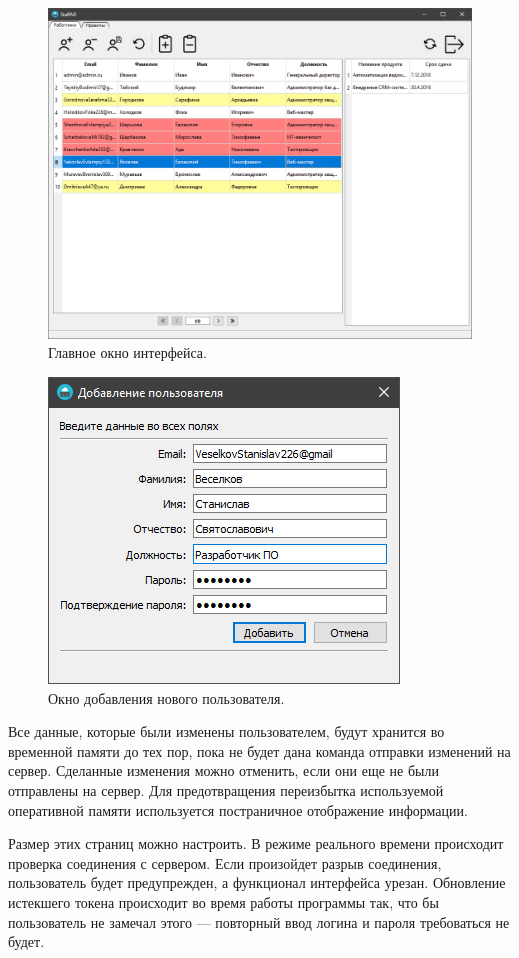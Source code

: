 \begin{figure}[h]
    \centering
    \includegraphics[width=1\linewidth]{img/main_window_win.png}
    \caption{Главное окно интерфейса.}
    \label{fig:main_window_win}
\end{figure}

\begin{figure}[h]
    \centering
    \includegraphics[width=0.4\linewidth]{img/add_user_window_win.png}
    \caption{Окно добавления нового пользователя.}
    \label{fig:add_user_window_win}
\end{figure}

Все данные, которые были изменены пользователем, будут хранится во временной памяти до тех пор, пока не будет дана команда отправки изменений на сервер. Сделанные изменения можно отменить, если они еще не были отправлены на сервер. Для предотвращения переизбытка используемой оперативной памяти используется постраничное отображение информации.

Размер этих страниц можно настроить. В режиме реального времени происходит проверка соединения с сервером. Если произойдет разрыв соединения, пользователь будет предупрежден, а функционал интерфейса урезан. Обновление истекшего токена происходит во время работы программы так, что бы пользователь не замечал этого --- повторный ввод логина и пароля требоваться не будет.

